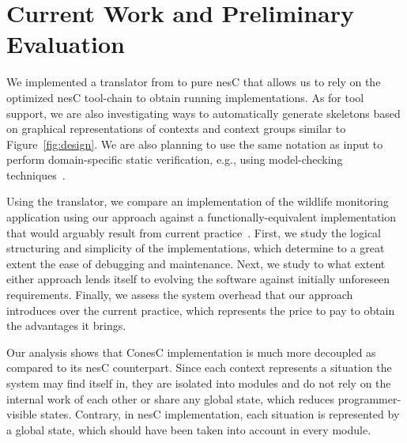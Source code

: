 \section{Current Work and Preliminary Evaluation}
\label{sec:eval}

We implemented a translator from \conesc to pure nesC that allows us
to rely on the optimized nesC tool-chain to obtain running
implementations. As for tool support, we are also investigating ways
to automatically generate \conesc skeletons based on graphical
representations of contexts and context groups similar to
Figure~\ref{fig:design}. We are also planning to use the same notation
as input to perform domain-specific static verification, e.g., using
model-checking techniques~\cite{mottolaicse}.

Using the translator, we compare an implementation of the wildlife
monitoring application using our approach against a
functionally-equivalent implementation that would arguably result from
current practice~\cite{programmingsurvey,badgersEWSN}. First, we study
the logical structuring and simplicity of the implementations, which
determine to a great extent the ease of debugging and
maintenance. Next, we study to what extent either approach lends
itself to evolving the software against initially unforeseen
requirements. Finally, we assess the system overhead that our approach
introduces over the current practice, which represents the price to
pay to obtain the advantages it brings.


Our analysis shows that ConesC implementation is much more decoupled as
compared to its nesC counterpart. Since each context represents a situation
the system may find itself in, they are isolated into modules and do not rely
on the internal work of each other or share any global state, which reduces
programmer-visible states. Contrary, in nesC implementation, each situation
is represented by a global state, which should have been taken into account
in every module.



